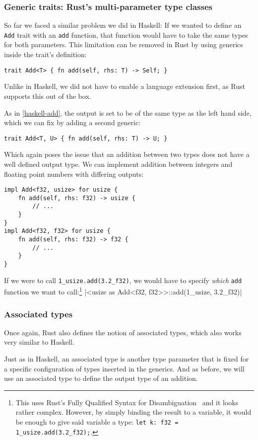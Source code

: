 \subsubsection{Generic traits: Rust's multi-parameter type classes}

So far we faced a similar problem we did in Haskell: If we wanted to define an \verb|Add| trait with an \verb|add| function, that function would have to take the same types for both parameters. This limitation can be removed in Rust by using generics inside the trait's definition:
\begin{verbatim}
trait Add<T> { fn add(self, rhs: T) -> Self; }
\end{verbatim}
Unlike in Haskell, we did not have to enable a language extension first, as Rust supports this out of the box.

As in \autoref{haskell-add}, the output is set to be of the same type as the left hand side, which we can fix by adding a second generic:
\begin{verbatim}
trait Add<T, U> { fn add(self, rhs: T) -> U; }
\end{verbatim}
Which again poses the issue that an addition between two types does not have a well defined output type. We can implement addition between integers and floating point numbers with differing outputs:
\begin{verbatim}
impl Add<f32, usize> for usize {
    fn add(self, rhs: f32) -> usize {
        // ...
    }
}
impl Add<f32, f32> for usize {
    fn add(self, rhs: f32) -> f32 {
        // ...
    }
}
\end{verbatim}
If we were to call \verb|1_usize.add(3.2_f32)|, we would have to specify \textit{which} \verb|add| function we want to call:\footnote{This uses Rust's Fully Qualified Syntax for Disambiguation~\cite{rust-book} and it looks rather complex. However, by simply binding the result to a variable, it would be enough to give said variable a type: \verb|let k: f32 = 1_usize.add(3.2_f32);|.}
|<usize as Add<f32, f32>>::add(1_usize, 3.2_f32)|

\subsubsection{Associated types}

Once again, Rust also defines the notion of associated types, which also works very similar to Haskell.

Just as in Haskell, an associated type is another type parameter that is fixed for a specific configuration of types inserted in the generics. And as before, we will use an associated type to define the output type of an addition.

